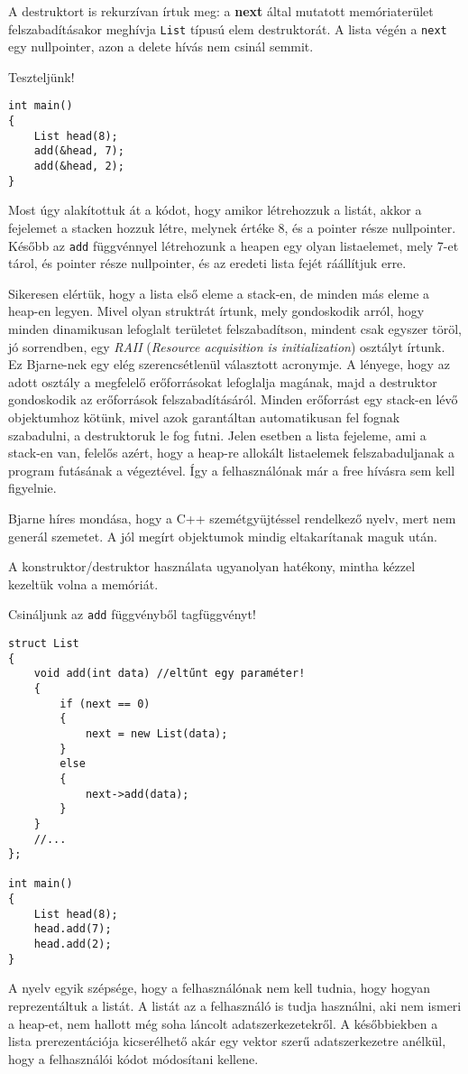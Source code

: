 \documentclass[../cpp_book/cpp_book.tex]{subfiles}
\begin{document}
	\medskip
	A destruktort is rekurzívan írtuk meg: a \textbf{next} által mutatott memóriaterület felszabadításakor meghívja \texttt{List} típusú elem destruktorát. A lista végén a \texttt{next} egy nullpointer, azon a delete hívás nem csinál semmit.
	
	\medskip
	Teszteljünk!
	\begin{lstlisting}
int main()
{
	List head(8);
	add(&head, 7);
	add(&head, 2);
}
	\end{lstlisting}
	Most úgy alakítottuk át a kódot, hogy amikor létrehozzuk a listát, akkor a fejelemet a stacken hozzuk létre, melynek értéke 8, és a pointer része nullpointer. Később az \texttt{add} függvénnyel létrehozunk a heapen egy olyan listaelemet, mely 7-et tárol, és pointer része nullpointer, és az eredeti lista fejét ráállítjuk erre.
	\medskip
	
	Sikeresen elértük, hogy a lista első eleme a stack-en, de minden más eleme a heap-en legyen. Mivel olyan struktrát írtunk, mely gondoskodik arról, hogy minden dinamikusan lefoglalt területet felszabadítson, mindent csak egyszer töröl, jó sorrendben, egy  \textit{RAII} (\textit{Resource acquisition is initialization}) osztályt írtunk. Ez Bjarne-nek egy elég szerencsétlenül választott acronymje. A lényege, hogy az adott osztály a megfelelő erőforrásokat lefoglalja magának, majd a destruktor gondoskodik az erőforrások felszabadításáról. Minden erőforrást egy stack-en lévő objektumhoz kötünk, mivel azok garantáltan automatikusan fel fognak szabadulni, a destruktoruk le fog futni. Jelen esetben a lista fejeleme, ami a stack-en van, felelős azért, hogy a heap-re allokált listaelemek felszabaduljanak a program futásának a végeztével. Így a felhasználónak már a free hívásra sem kell figyelnie.
	
	Bjarne híres mondása, hogy a C++ szemétgyüjtéssel rendelkező nyelv, mert nem generál szemetet. A jól megírt objektumok mindig eltakarítanak maguk után. 
	\medskip
	
	A konstruktor/destruktor használata ugyanolyan hatékony, mintha kézzel kezeltük volna a memóriát.
	
	\medskip
	Csináljunk az \texttt{add} függvényből tagfüggvényt!
	\begin{lstlisting}
struct List
{	
	void add(int data) //eltűnt egy paraméter!
	{
		if (next == 0)
		{
			next = new List(data);
		}
		else
		{
			next->add(data);
		}
	}
	//...
};

int main()
{
	List head(8);
	head.add(7);
	head.add(2);
}
	\end{lstlisting}
	A nyelv egyik szépsége, hogy a felhasználónak nem kell tudnia, hogy hogyan reprezentáltuk a listát. A listát az a felhasználó is tudja használni, aki nem ismeri a heap-et, nem hallott még soha láncolt adatszerkezetekről. A későbbiekben a lista prerezentációja kicserélhető akár egy vektor szerű adatszerkezetre anélkül, hogy a felhasználói kódot módosítani kellene.
	\medskip
	
\end{document}
